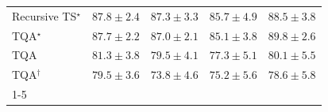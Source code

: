 \begin{tabular}{l|cccc|}
Recursive TS$^\star$ & {\cellcolor[HTML]{034B76}} \color[HTML]{F1F1F1} $87.8\pm 2.4$ & {\cellcolor[HTML]{034D79}} \color[HTML]{F1F1F1} $87.3\pm 3.3$ & {\cellcolor[HTML]{045687}} \color[HTML]{F1F1F1} $85.7\pm 4.9$ & {\cellcolor[HTML]{034871}} \color[HTML]{F1F1F1} $88.5\pm 3.8$ \\
TQA$^\star$ & {\cellcolor[HTML]{034B76}} \color[HTML]{F1F1F1} $87.7\pm 2.2$ & {\cellcolor[HTML]{034F7D}} \color[HTML]{F1F1F1} $87.0\pm 2.1$ & {\cellcolor[HTML]{04598C}} \color[HTML]{F1F1F1} $85.1\pm 3.8$ & {\cellcolor[HTML]{034165}} \color[HTML]{F1F1F1} $89.8\pm 2.6$ \\
TQA & {\cellcolor[HTML]{0567A1}} \color[HTML]{F1F1F1} $81.3\pm 3.8$ & {\cellcolor[HTML]{056CAA}} \color[HTML]{F1F1F1} $79.5\pm 4.1$ & {\cellcolor[HTML]{0D75B3}} \color[HTML]{F1F1F1} $77.3\pm 5.1$ & {\cellcolor[HTML]{056AA6}} \color[HTML]{F1F1F1} $80.1\pm 5.5$ \\
TQA$^\dagger$ & {\cellcolor[HTML]{056CAA}} \color[HTML]{F1F1F1} $79.5\pm 3.6$ & {\cellcolor[HTML]{2786BB}} \color[HTML]{F1F1F1} $73.8\pm 4.6$ & {\cellcolor[HTML]{1C7FB8}} \color[HTML]{F1F1F1} $75.2\pm 5.6$ & {\cellcolor[HTML]{056FAF}} \color[HTML]{F1F1F1} $78.6\pm 5.8$ \\
\cline{1-5}
\bottomrule
\end{tabular}
